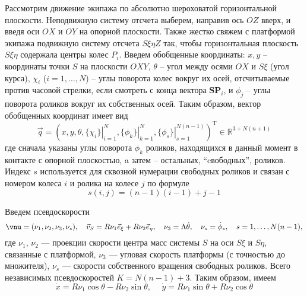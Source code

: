 Рассмотрим движение экипажа по абсолютно шероховатой горизонтальной плоскости. Неподвижную систему отсчета выберем, направив ось $OZ$ вверх, и введя оси $OX$ и $OY$ на опорной плоскости.
Также жестко свяжем с платформой экипажа подвижную систему отсчета $S\xi\eta Z$ так, чтобы горизонтальная плоскость $S\xi\eta$ содержала центры колес $P_i$.
Введем обобщенные координаты:
$x, y$ -- координаты точки $S$ на плоскости $OXY$, $\theta$ -- угол между осями $OX$ и $S\xi$ (угол курса),
$\chi_i$ ($i = 1,\dots,N$) -- углы поворота колес вокруг их осей, отсчитываемые против часовой стрелки, если смотреть с конца вектора $\mathbf{SP}_i$, и $\phi_j$ -- углы поворота роликов вокруг их собственных осей.
Таким образом, вектор обобщенных координат имеет вид
$$\vec{q} = (
    x, y, \theta,
    \left.\{\chi_i\}\right|_{i=1}^N ,
    \left.\{\phi_k\}\right|_{k=1}^N,
    \left.\{\phi_s\}\right|_{s=1}^{N(n - 1)}
)^{\mathop{T}}\in\mathbb{R}^{3 + N(n+1)}$$ 
где сначала указаны углы поворота $\phi_k$ роликов, находящихся в данный момент в контакте с опорной плоскостью, a затем -- остальных, ``cвободных'', роликов. Индекс $s$ используется для сквозной нумерации свободных роликов и связан с номером колеса $i$ и ролика на колесе $j$ по формуле
\begin{equation}\label{eq:num}
    s(i, j) = (n-1)(i-1) + j - 1
\end{equation}

Введем псевдоскорости $$\vnu = (\nu_1, \nu_2, \nu_3, \nu_s), \quad \vec{v}_S = R\nu_1\vec{e}_\xi + R\nu_2\vec{e}_\eta, \quad \nu_3 = \Lambda\dot{\theta},\quad \nu_s = \dot{\phi}_s, \quad s = 1,\ldots,N(n-1),$$
где $\nu_1$, $\nu_2$ --- проекции скорости центра масс системы $S$ на оси $S\xi$ и $S\eta$, связанные с платформой, $\nu_3$ --- угловая скорость платформы (с точностью до множителя), $\nu_s$ --- скорости собственного вращения свободных роликов. Всего независимых псевдоскоростей $K = N(n-1)+3$. Таким образом, имеем
$$ \dot{x} = R \nu_1\cos\theta-R\nu_2\sin\theta, \hspace{15pt} \dot{y} = R\nu_1\sin\theta+R\nu_2\cos\theta$$

